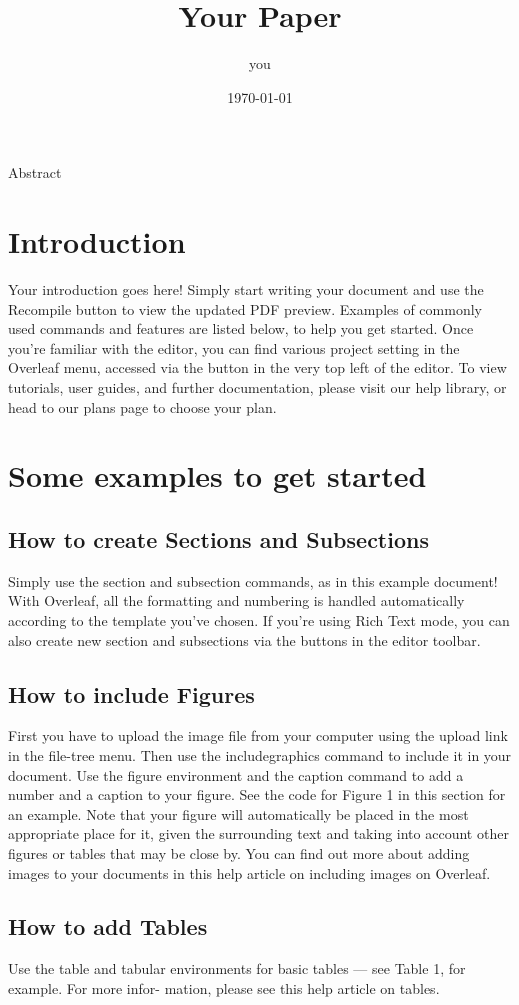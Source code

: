 \documentclass{article}
\title{Your Paper}
\author{you}
\date{\today}
\begin{document}
	\maketitle
	 \hspace{4.50cm} {Abstract}
\section{Introduction}
  Your introduction goes here! Simply start writing your document and use the Recompile button to
  view the updated PDF preview. Examples of commonly used commands and features are listed below,
  to help you get started.\vspace{5mm} Once you’re familiar with the editor, you can find various project setting in the Overleaf menu,
  accessed via the button in the very top left of the editor. To view tutorials, user guides, and further
  documentation, please visit our help library, or head to our plans page to choose your plan.
 \section{Some examples to get started}
 \subsection{How to create Sections and Subsections}
 Simply use the section and subsection commands, as in this example document! With Overleaf, all
 the formatting and numbering is handled automatically according to the template you’ve chosen. If
 you’re using Rich Text mode, you can also create new section and subsections via the buttons in the
 editor toolbar.
 \subsection{How to include Figures}
 First you have to upload the image file from your computer using the upload link in the file-tree menu.
 Then use the includegraphics command to include it in your document. Use the figure environment
 and the caption command to add a number and a caption to your figure. See the code for Figure 1 in
 this section for an example.
 Note that your figure will automatically be placed in the most appropriate place for it, given the
 surrounding text and taking into account other figures or tables that may be close by. You can find
 out more about adding images to your documents in this help article on including images on Overleaf.
 \subsection{How to add Tables }
 Use the table and tabular environments for basic tables — see Table 1, for example. For more infor-
 mation, please see this help article on tables.
\end{document}
